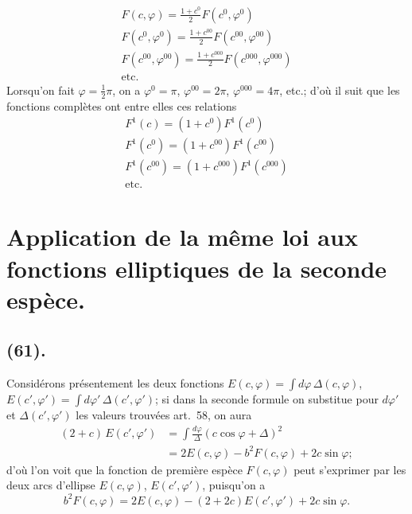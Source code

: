 \documentclass{article}
\begin{document}
\[ \begin{gathered} F(c,\varphi)=\frac{1+c^{0}}{2}F(c^{0},\varphi^{0})\\ F(c^{0},\varphi^{0})=\frac{1+c^{00}}{2}F(c^{00},\varphi^{00})\\ F(c^{00},\varphi^{00})=\frac{1+c^{000}}{2}F(c^{000},\varphi^{000})\\ \text{etc.} \end{gathered} \]
Lorsqu'on fait $\varphi=\frac{1}{2}\pi$, on a $\varphi^{0}=\pi$, $\varphi^{00}=2\pi$, $\varphi^{000}=4\pi$, etc.; d'où il suit que les fonctions complètes ont entre elles ces relations
\[ \begin{gathered} F^{1}(c)=(1+c^{0})F^{1}(c^{0})\\ F^{1}(c^{0})=(1+c^{00})F^{1}(c^{00})\\ F^{1}(c^{00})=(1+c^{000})F^{1}(c^{000})\\ \text{etc.} \end{gathered} \]

\section*{Application de la même loi aux fonctions elliptiques de la seconde espèce.}

\subsection*{(61).}

Considérons présentement les deux fonctions $E(c,\varphi)=\displaystyle\int d\varphi\,\Delta(c,\varphi)$, $E(c',\varphi')=\displaystyle\int d\varphi'\,\Delta(c',\varphi')$; si dans la seconde formule on substitue pour $d\varphi'$ et $\Delta(c',\varphi')$ les valeurs trouvées art.~58, on aura
\[ \begin{aligned} (2+c)\,E(c',\varphi')&=\int\frac{d\varphi}{\Delta}(c\cos\varphi+\Delta)^{2}\\ &=2E(c,\varphi)-b^{2}F(c,\varphi)+2c\sin\varphi; \end{aligned} \]
d'où l'on voit que la fonction de première espèce $F(c,\varphi)$ peut s'exprimer par les deux arcs d'ellipse $E(c,\varphi)$, $E(c',\varphi')$, puisqu'on a
\[ b^{2}F(c,\varphi)=2E(c,\varphi)-(2+2c)E(c',\varphi')+2c\sin\varphi. \]
\end{document}
